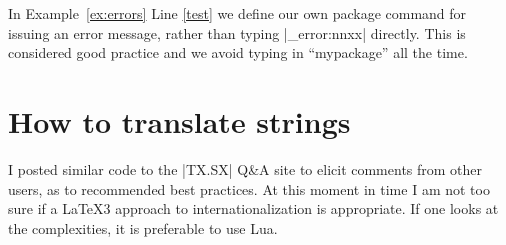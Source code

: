 In Example~\ref{ex:errors} Line \ref{test} we define our own package command for issuing an error message, rather than typing |\msg_error:nnxx| directly. This is considered good practice and we avoid typing in \enquote{mypackage} all the time. 

\section{How to translate strings}

I posted similar code to the |TX.SX| Q\&A site to elicit comments from other users, as to recommended best practices.
At this moment in time I am not too sure if a LaTeX3 approach to internationalization is appropriate. If one looks at the complexities, it is preferable to use Lua. 





